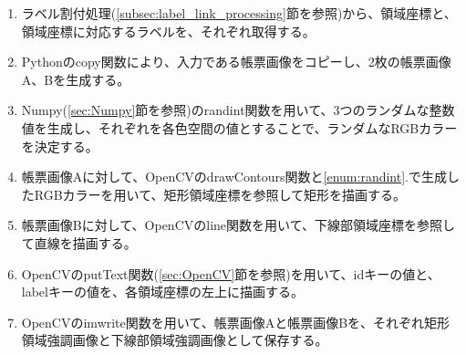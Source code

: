 \begin{enumerate}
    \item ラベル割付処理(\ref{subsec:label_link_processing}節を参照)から、領域座標と、領域座標に対応するラベルを、それぞれ取得する。
    \item Pythonのcopy関数により、入力である帳票画像をコピーし、2枚の帳票画像A、Bを生成する。
    \item \label{enum:randint}Numpy(\ref{sec:Numpy}節を参照)のrandint関数を用いて、3つのランダムな整数値を生成し、それぞれを各色空間の値とすることで、ランダムなRGBカラーを決定する。
    \item 帳票画像Aに対して、OpenCVのdrawContours関数と\ref{enum:randint}.で生成したRGBカラーを用いて、矩形領域座標を参照して矩形を描画する。
    \item 帳票画像Bに対して、OpenCVのline関数を用いて、下線部領域座標を参照して直線を描画する。
    \item OpenCVのputText関数(\ref{sec:OpenCV}節を参照)を用いて、idキーの値と、labelキーの値を、各領域座標の左上に描画する。
    \item OpenCVのimwrite関数を用いて、帳票画像Aと帳票画像Bを、それぞれ矩形領域強調画像と下線部領域強調画像として保存する。
\end{enumerate}

